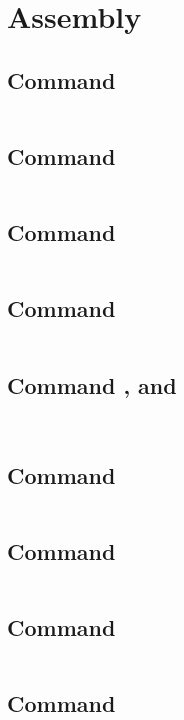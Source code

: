 \chapter{Assembly}


\section{Command }
\label{asm:cmd_0}
\inputminted[fontsize=\small]{asm}{../ucode/command_0.asm}
\section{Command }
\label{asm:cmd_1}
\inputminted[fontsize=\small]{asm}{../ucode/command_1.asm}
\section{Command }
\label{asm:cmd_2}
\inputminted[fontsize=\small]{asm}{../ucode/command_2.asm}
\section{Command }
\label{asm:cmd_3}
\inputminted[fontsize=\small]{asm}{../ucode/command_3.asm}
\section{Command ,  and }
\label{asm:cmd_459}
\inputminted[fontsize=\small]{asm}{../ucode/command_4.asm}\inputminted[fontsize=\small]{asm}{../ucode/mix_buffers.asm}
\section{Command }
\label{asm:cmd_6}
\inputminted[fontsize=\small]{asm}{../ucode/command_6.asm}
\section{Command }
\label{asm:cmd_7}
\inputminted[fontsize=\small]{asm}{../ucode/command_7.asm}
\section{Command }
\label{asm:cmd_8}
\inputminted[fontsize=\small]{asm}{../ucode/command_8.asm}
\section{Command }
\label{asm:cmd_d}
\inputminted[fontsize=\small]{asm}{../ucode/command_d.asm}
